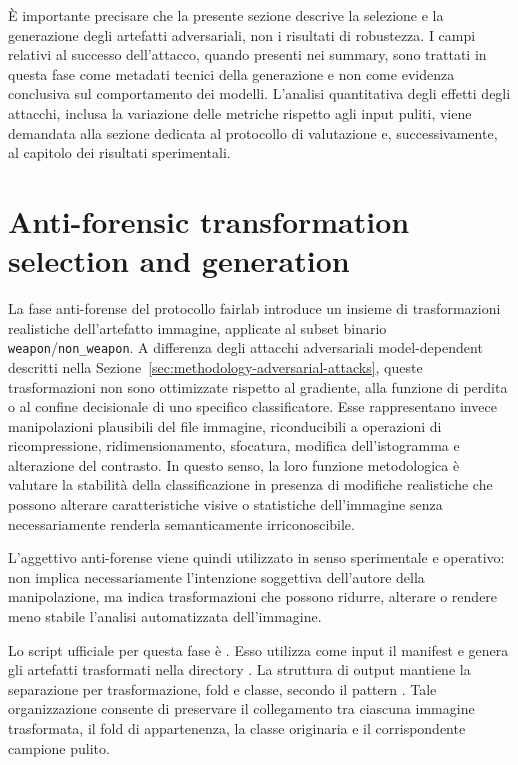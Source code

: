 È importante precisare che la presente sezione descrive la selezione e la
generazione degli artefatti adversariali, non i risultati di robustezza. I campi
relativi al successo dell'attacco, quando presenti nei summary, sono trattati in
questa fase come metadati tecnici della generazione e non come evidenza
conclusiva sul comportamento dei modelli. L'analisi quantitativa degli effetti
degli attacchi, inclusa la variazione delle metriche rispetto agli input puliti,
viene demandata alla sezione dedicata al protocollo di valutazione e,
successivamente, al capitolo dei risultati sperimentali.

\section{Anti-forensic transformation selection and generation}
\label{sec:methodology-anti-forensic-transformations}

La fase anti-forense del protocollo \gls{fairlab} introduce un insieme di trasformazioni
realistiche dell'artefatto immagine, applicate al subset binario
\texttt{weapon}/\texttt{non\_weapon}. A differenza degli attacchi adversariali
model-dependent descritti nella Sezione~\ref{sec:methodology-adversarial-attacks},
queste trasformazioni non sono ottimizzate rispetto al gradiente, alla funzione
di perdita o al confine decisionale di uno specifico classificatore. Esse
rappresentano invece manipolazioni plausibili del file immagine, riconducibili
a operazioni di ricompressione, ridimensionamento, sfocatura, modifica
dell'istogramma e alterazione del contrasto. In questo senso, la loro funzione
metodologica è valutare la stabilità della classificazione in presenza di
modifiche realistiche che possono alterare caratteristiche visive o statistiche
dell'immagine senza necessariamente renderla semanticamente irriconoscibile.


L'aggettivo anti-forense viene quindi utilizzato in senso sperimentale e
operativo: non implica necessariamente l'intenzione soggettiva dell'autore della
manipolazione, ma indica trasformazioni che possono ridurre, alterare o rendere
meno stabile l'analisi automatizzata dell'immagine.

Lo script ufficiale per questa fase è
.
Esso utilizza come input il manifest
 e genera gli
artefatti trasformati nella directory . La
struttura di output mantiene la separazione per trasformazione, fold e classe,
secondo il pattern
.
Tale organizzazione consente di preservare il collegamento tra ciascuna immagine
trasformata, il fold di appartenenza, la classe originaria e il corrispondente
campione pulito.

